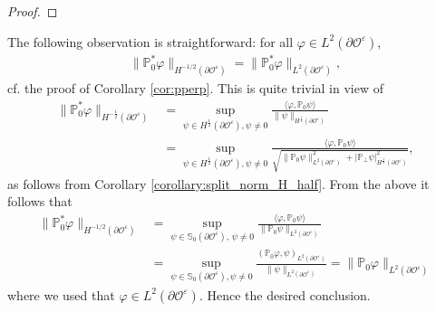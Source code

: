 \documentclass[]{article}
\numberwithin{equation}{section}
\numberwithin{theorem}{section}
\numberwithin{lemma}{section}
\numberwithin{corollary}{section}
\numberwithin{proposition}{section}
\numberwithin{definition}{section}
\newcommand{\re}{\varepsilon}
\renewcommand{\O}{\mathcal{O}}
\newcommand{\bO}{\partial\O}
\begin{document}
\begin{appendices}
\begin{proof}
		\end{proof}
		The following observation is straightforward: for all $\varphi\in L^2(\partial\O^{\re})$, 	
		\begin{align}
			\label{eq:p00}
			\|\mathbb{P}_0^*\varphi\|_{H^{-1/2}(\partial\O^{\re})}=\|\mathbb{P}_0^*\varphi\|_{L^2(\partial\O^{\re})}, 	
		\end{align} 
		cf. the proof of Corollary \ref{cor:pperp}.
		This is quite trivial in view of 
		\begin{align*}
			\|\mathbb{P}_0^*\varphi\|_{H^{-\frac{1}{2}}(\partial\O^{\re})}&=\sup\limits_{\psi\in H^{\frac{1}{2}}(\partial\O^{\re}), \psi\neq 0}\frac{\langle \varphi, \mathbb{P}_0\psi\rangle}{\|\psi\|_{H^{\frac{1}{2}}(\partial\O^{\re})}}\\
			&=\sup_{\psi\in H^{\frac{1}{2}}(\partial\mathcal{O}^{\re}), \psi\neq 0}\frac{\langle \varphi, \mathbb{P}_0\psi\rangle}{\sqrt{\|\mathbb{P}_0\psi\|^2_{L^2(\partial\O^{\re})}+|\mathbb{P}_{\perp}\psi|^2_{H^{\frac{1}{2}}(\partial\O^{\re})}}},
		\end{align*}
		as follows from Corollary \ref{corollary:split_norm_H_half}. From the above it follows that
		\begin{align*}
			\|\mathbb{P}_0^*\varphi\|_{H^{-1/2}(\partial\O^{\re})}&=\sup_{\psi\in \mathbb{S}_0(\partial\mathcal{O}^{\re}),\, \psi\neq 0}\frac{\langle \varphi, \mathbb{P}_0\psi\rangle}{\|\mathbb{P}_0\psi\|_{L^2(\partial\O^{\re})}}\\
			&=\sup_{\psi\in \mathbb{S}_0(\partial\mathcal{O}^{\re}), \psi\neq 0}\frac{(\mathbb{P}_0\varphi, \psi)_{L^2(\bO^{\re})}}{\|\psi\|_{L^2(\partial\O^{\re})}}=\|\mathbb{P}_0\varphi\|_{L^2(\partial\O^{\re})}
		\end{align*}
		where we used that  $\varphi\in L^2(\partial\O^{\re})$. Hence the desired conclusion.
		

\end{appendices}
\end{document}
